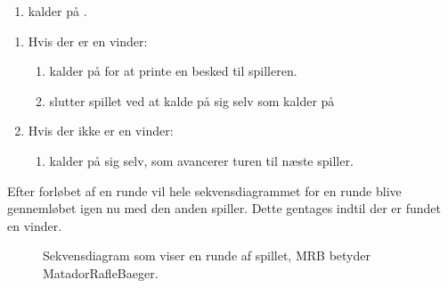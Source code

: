 \begin{enumerate}
\begin{enumerate}
\begin{enumerate}
\item {} kalder  på .
\end{enumerate}
\end{enumerate}
\begin{enumerate}
\item Hvis der er en vinder:
\begin{enumerate}
\item {} kalder  på  for at printe en besked til spilleren.
\item {} slutter spillet ved at kalde  på sig selv som kalder  på 
\end{enumerate}
\item Hvis der ikke er en vinder:
\begin{enumerate}
\item {} kalder  på sig selv, som avancerer turen til næste spiller.
\end{enumerate}
\end{enumerate}
\end{enumerate}

Efter forløbet af en runde vil hele sekvensdiagrammet for en runde blive gennemløbet igen nu med den anden spiller. Dette gentages indtil der er fundet en vinder.

\begin{figure}
\centering
\caption{Sekvensdiagram som viser en runde af spillet, MRB betyder MatadorRafleBaeger.}\label{fig:tikzSekvensGame8}
\end{figure}

\FloatBarrier